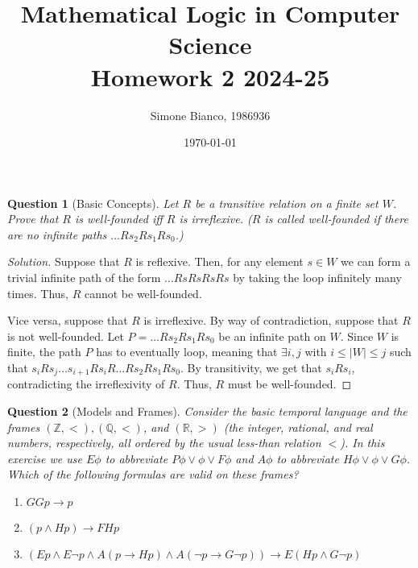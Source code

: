 \documentclass[12pt,a4paper]{report}
\newtheorem{question}{Question}
\theoremstyle{definition}
\newcommand{\abs}[1]{\left|#1\right|}
\newcommand{\Z}{\mathbb{Z}}                     %
\newcommand{\Q}{\mathbb{Q}}                     %
\newcommand{\R}{\mathbb{R}}                     %
\begin{document}
    \setlength{\parskip}{5pt}               %
    \setlength{\parindent}{0pt}             %

    \title{Mathematical Logic in Computer Science \\ Homework 2 2024-25}
    \author{Simone Bianco, 1986936}
    \date{\today}

    \maketitle

    \begin{question}[Basic Concepts]
        Let $R$ be a transitive relation on a finite set $W$. Prove that $R$ is well-founded iff $R$ is irreflexive. ($R$ is called well-founded if there are no infinite paths $\ldots Rs_2Rs_1Rs_0$.)
    \end{question}

    \begin{proof}[Solution]
        Suppose that $R$ is reflexive. Then, for any element $s \in W$ we can form a trivial infinite path of the form $\ldots Rs R s R s R s$ by taking the loop infinitely many times. Thus, $R$ cannot be well-founded.

        Vice versa, suppose that $R$ is irreflexive. By way of contradiction, suppose that $R$ is not well-founded. Let $P = \ldots Rs_2Rs_1Rs_0$ be an infinite path on $W$. Since $W$ is finite, the path $P$ has to eventually loop, meaning that $\exists i,j$ with $i \leq \abs{W} \leq j$ such that $s_i R s_j \ldots s_{i+1}Rs_iR \ldots Rs_2Rs_1Rs_0$. By transitivity, we get that $s_i R s_i$, contradicting the irreflexivity of $R$. Thus, $R$ must be well-founded.
    \end{proof}
    
    \begin{question}[Models and Frames]
        Consider the basic temporal language and the frames $(\Z, <), (\Q, <)$, and $(\R, >)$ (the integer, rational, and real numbers, respectively, all ordered by the usual less-than relation $<$). In this exercise we use $E\phi$ to abbreviate $P\phi \lor \phi \lor F \phi$ and $A \phi$ to abbreviate $H\phi \lor \phi \lor G \phi$. Which of the following formulas are valid on these frames?
        \begin{enumerate}
            \item $GGp \to p$
            \item $(p \land Hp) \to F Hp$
            \item $(Ep \land E \lnot p \land A(p \to Hp) \land A(\lnot p \to G \lnot p)) \to E(Hp \land G \lnot p)$
        \end{enumerate}
    \end{question}
\end{document}
